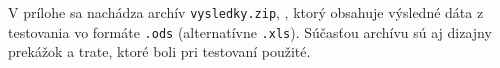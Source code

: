 V prílohe sa nachádza archív \verb|vysledky.zip|, , ktorý obsahuje výsledné dáta z testovania vo formáte \verb|.ods| (alternatívne \verb|.xls|). Súčasťou archívu sú aj dizajny prekážok a trate, ktoré boli pri testovaní použité.
